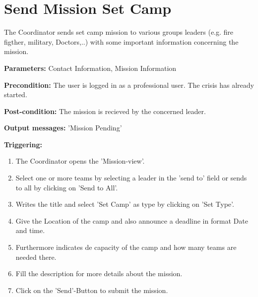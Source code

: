 \section{Send Mission Set Camp}
\label{operation:SetCamp}
The Coordinator sends set camp mission to various groups leaders (e.g. fire
figther, military, Doctors,..) with some important information concerning the
mission.\\
\begin{description}
\item \textbf{Parameters:} Contact Information, Mission Information
\item \textbf{Precondition:} The user is logged in as a professional user. The
crisis has already started.  
\item \textbf{Post-condition:} The mission is recieved by the concerned leader.
\item \textbf{Output messages:} 'Mission Pending'
\item \textbf{Triggering:}
\begin{enumerate}
\item The Coordinator opens the 'Mission-view'.
\item Select one or more teams by selecting a leader in the 'send to' field or
sends to all by clicking on 'Send to All'.
\item Writes the title and select 'Set Camp' as type by clicking on 'Set
Type'.
\item Give the Location of the camp and also announce a deadline in format Date
and time.
\item Furthermore indicates de capacity of the camp and how many teams are
needed there.
\item Fill the description for more details about the mission.
\item Click on the 'Send'-Button to submit the mission.
\end{enumerate}
\end{description}

